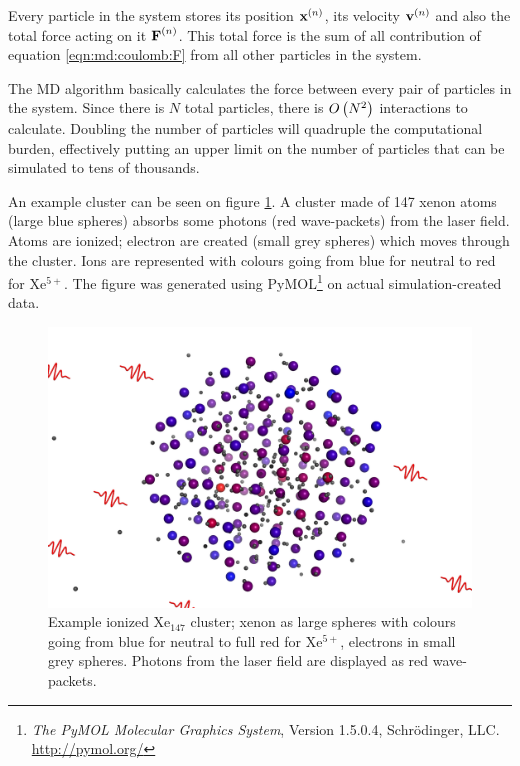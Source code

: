 Every particle in the system stores its position $\textbf{x}^{\left( n \right)}$, its velocity
$\textbf{v}^{\left( n \right)}$ and also the total force acting on it $\textbf{F}^{\left( n \right)}$. This total
force is the sum of all contribution of equation \eqref{eqn:md:coulomb:F} from
all other particles in the system.

The MD algorithm basically calculates the force between every pair of particles
in the system. Since there is $N$ total particles, there is $O\left( N^2 \right)$
interactions to calculate. Doubling the number of particles will quadruple the
computational burden, effectively putting an upper limit on the number of
particles that can be simulated to tens of thousands.

An example cluster can be seen on figure \ref{fig:md:cluster}. A cluster
made of 147 xenon atoms (large blue spheres) absorbs some photons (red
wave-packets) from the laser field. Atoms are ionized; electron are created
(small grey spheres) which moves through the cluster. Ions are represented with
colours going from blue for neutral to red for Xe$^{5+}$. The figure was
generated using
PyMOL\footnote{\textit{The PyMOL Molecular Graphics System}, Version 1.5.0.4,
Schrödinger, LLC. \url{http://pymol.org/}} on actual simulation-created data.


\begin{figure}
 \centering
 \includegraphics[width=\figurewidth]{figures/cluster}
 \caption{\label{fig:md:cluster}Example ionized Xe$_{147}$ cluster; xenon as
          large spheres with colours going from blue for neutral to full red for
          Xe$^{5+}$, electrons in small grey spheres. Photons from the laser
          field are displayed as red wave-packets.}
\end{figure}



